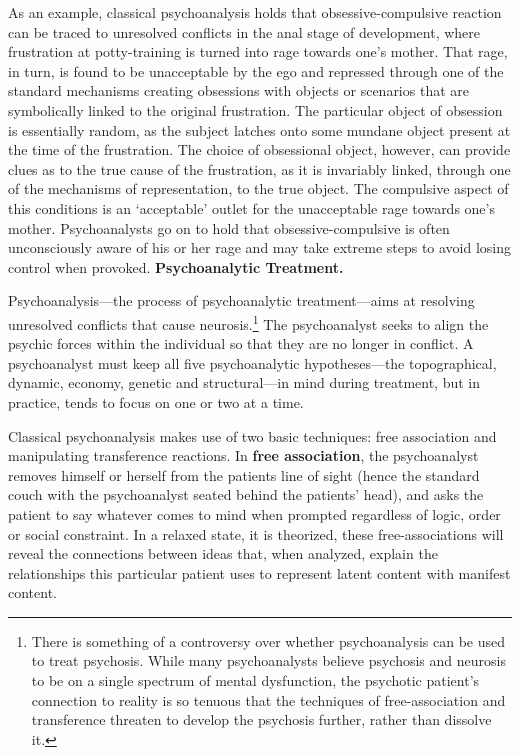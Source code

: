 As an example, classical psychoanalysis holds that obsessive-compulsive reaction can be traced to unresolved conflicts in the anal stage of development, where frustration at potty-training is turned into rage towards one's mother. That rage, in turn, is found to be unacceptable by the ego and repressed through one of the standard mechanisms creating obsessions with objects or scenarios that are symbolically linked to the original frustration. The particular object of obsession is essentially random, as the subject latches onto some mundane object present at the time of the frustration. The choice of obsessional object, however, can provide clues as to the true cause of the frustration, as it is invariably linked, through one of the mechanisms of representation, to the true object. The compulsive aspect of this conditions is an `acceptable' outlet for the unacceptable rage towards one's mother. Psychoanalysts go on to hold that obsessive-compulsive is often unconsciously aware of his or her rage and may take extreme steps to avoid losing control when provoked.
\textbf{Psychoanalytic Treatment.}

Psychoanalysis---the process of psychoanalytic treatment---aims at resolving unresolved conflicts that cause neurosis.\footnote{There is something of a controversy over whether psychoanalysis can be used to treat psychosis. While many psychoanalysts believe psychosis and neurosis to be on a single spectrum of mental dysfunction, the psychotic patient's connection to reality is so tenuous that the techniques of free-association and transference threaten to develop the psychosis further, rather than dissolve it.} The psychoanalyst seeks to align the psychic forces within the individual so that they are no longer in conflict. A psychoanalyst must keep all five psychoanalytic hypotheses---the topographical, dynamic, economy, genetic and structural---in mind during treatment, but in practice, tends to focus on one or two at a time. 

Classical psychoanalysis makes use of two basic techniques: free association and manipulating transference reactions. In \textbf{free association}, the psychoanalyst removes himself or herself from the patients line of sight (hence the standard couch with the psychoanalyst seated behind the patients' head), and asks the patient to say whatever comes to mind when prompted regardless of logic, order or social constraint. In a relaxed state, it is theorized, these free-associations will reveal the connections between ideas that, when analyzed, explain the relationships this particular patient uses to represent latent content with manifest content.


